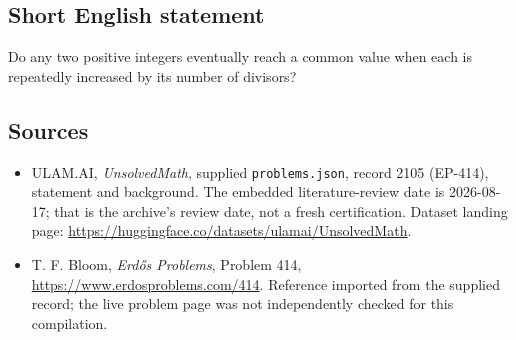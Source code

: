 \documentclass[11pt,a4paper]{article}
\begin{document}
\subsection{Short English statement}

Do any two positive integers eventually reach a common value when each is repeatedly increased by its number of divisors?

\subsection{Sources}

{\small

\begin{itemize}

\item[\hypertarget{source:2105:1}{S1}] ULAM.AI, \emph{UnsolvedMath}, supplied \texttt{problems.json}, record 2105 (EP-414), statement and background. The embedded literature-review date is 2026-08-17; that is the archive’s review date, not a fresh certification. Dataset landing page: \url{https://huggingface.co/datasets/ulamai/UnsolvedMath}.

\item[\hypertarget{source:2105:2}{S2}] T. F. Bloom, \emph{Erdős Problems}, Problem 414, \url{https://www.erdosproblems.com/414}. Reference imported from the supplied record; the live problem page was not independently checked for this compilation.

\end{itemize}

}

\label{end:2105}
\end{document}
